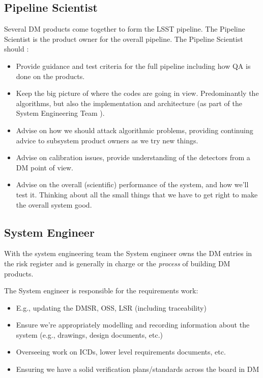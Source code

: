 \subsection{Pipeline Scientist \label{role:pipe }}
Several DM products come together to form the LSST pipeline. The Pipeline Scientist is the product owner for the overall pipeline. 
The Pipeline Scientist should :
\begin{itemize}
\item  Provide guidance and test criteria for the full pipeline including how QA is done on the products.  
\item Keep the big picture of where the codes are going in view. Predominantly the algorithms, but also the implementation and architecture (as part of the System Engineering Team ).


\item Advise on how we should attack algorithmic problems,  
providing continuing advice to subsystem product owners as we try new things. 

\item Advise on calibration issues, provide understanding of the detectors from a DM point of view. 

\item Advise on the overall (scientific) performance of the system, and how we'll test it.  Thinking about all the small things that we have to get right to make the overall system good.



\end{itemize}


\subsection{System Engineer \label{role:sysengineer }}
With the system engineering team  
 the System engineer 
 owns the DM entries in the risk register and is generally in charge or the {\em process} of building DM products. 

The System engineer  
is responsible for the requirements work:
\begin{itemize}
\item E.g., updating the DMSR, OSS, LSR (including traceability)
\item Ensure we’re appropriately modelling and recording information about the system (e.g.,
    drawings, design documents, etc.)
\item Overseeing work on ICDs, lower level requirements documents, etc.
\item Ensuring we have a solid verification plans/standards across the board in DM
\end{itemize}

